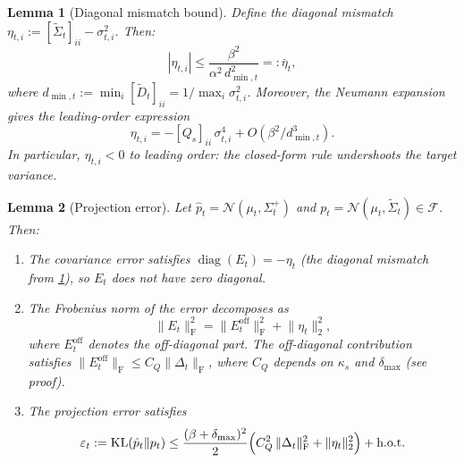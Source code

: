 \documentclass[10pt,a4paper]{amsart}
\newtheorem{lemma}{Lemma}
\newcommand{\F}{\mathcal{F}}
\DeclareMathOperator{\KL}{KL}
\DeclareMathOperator{\diag}{diag}
\newcommand{\fnorm}[1]{\lVert #1 \rVert_{\mathrm{F}}}
\newcommand{\norm}[1]{\lVert #1 \rVert}
\begin{document}
\begin{lemma}[Diagonal mismatch bound]
\label{lem:diag_mismatch}
Define the diagonal mismatch $\eta_{t,i} := [\widetilde{\Sigma}_t]_{ii} - \sigma_{t,i}^2$. Then:
\begin{equation}\label{eq:eta_bound}
|\eta_{t,i}| \leq \frac{\beta^2}{\alpha^2\, d_{\min,t}^2} =: \bar{\eta}_t,
\end{equation}
where $d_{\min,t} := \min_i [\widetilde{D}_t]_{ii} = 1/\max_i \sigma_{t,i}^2$. Moreover, the Neumann expansion gives the leading-order expression
\begin{equation}\label{eq:eta_leading}
\eta_{t,i} = -[Q_s]_{ii}\,\sigma_{t,i}^4 + O(\beta^2/d_{\min,t}^3).
\end{equation}
In particular, $\eta_{t,i} < 0$ to leading order: the closed-form rule undershoots the target variance.
\end{lemma}

\begin{lemma}[Projection error]
\label{lem:projection}
Let $\hat{p}_t = \mathcal{N}(\mu_t, \Sigma_t^+)$ and $p_t = \mathcal{N}(\mu_t, \widetilde{\Sigma}_t) \in \F$. Then:
\begin{enumerate}
\item[\textup{(a)}] The covariance error satisfies $\diag(E_t) = -\eta_t$ (the diagonal mismatch from \cref{lem:diag_mismatch}), so $E_t$ does \emph{not} have zero diagonal.
\item[\textup{(b)}] The Frobenius norm of the error decomposes as
\begin{equation}\label{eq:E_decomp}
\fnorm{E_t}^2 = \fnorm{E_t^{\mathrm{off}}}^2 + \norm{\eta_t}_2^2,
\end{equation}
where $E_t^{\mathrm{off}}$ denotes the off-diagonal part. The off-diagonal contribution satisfies $\fnorm{E_t^{\mathrm{off}}} \leq C_Q \fnorm{\Delta_t}$, where $C_Q$ depends on $\kappa_s$ and $\delta_{\max}$ (see proof).
\item[\textup{(c)}] The projection error satisfies
\begin{equation}\label{eq:proj_bound}
\varepsilon_t := \KL(\hat{p}_t \| p_t) \leq \frac{(\beta + \delta_{\max})^2}{2}\Bigl(C_Q^2\,\fnorm{\Delta_t}^2 + \norm{\eta_t}_2^2\Bigr) + \text{h.o.t.}
\end{equation}
\end{enumerate}
\end{lemma}
\end{document}
